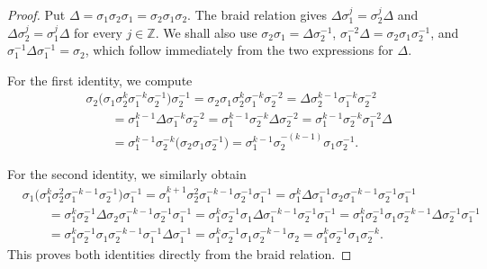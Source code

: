 \documentclass[10pt,a4paper]{amsart}
\begin{document}
\begin{proof}
Put $\Delta=\sigma_1\sigma_2\sigma_1=\sigma_2\sigma_1\sigma_2$. The braid relation gives $\Delta\sigma_1^j=\sigma_2^j\Delta$ and $\Delta\sigma_2^j=\sigma_1^j\Delta$ for every $j\in\mathbb Z$. We shall also use $\sigma_2\sigma_1=\Delta\sigma_2^{-1}$, $\sigma_1^{-2}\Delta=\sigma_2\sigma_1\sigma_2^{-1}$, and $\sigma_1^{-1}\Delta\sigma_1^{-1}=\sigma_2$, which follow immediately from the two expressions for $\Delta$.

For the first identity, we compute
\begin{align*}
&\sigma_2
 \bigl(\sigma_1\sigma_2^k\sigma_1^{-k}\sigma_2^{-1}\bigr)
 \sigma_2^{-1}
=\sigma_2\sigma_1\sigma_2^k\sigma_1^{-k}\sigma_2^{-2}
=\Delta\sigma_2^{k-1}\sigma_1^{-k}\sigma_2^{-2}\\
&\qquad
=\sigma_1^{k-1}\Delta\sigma_1^{-k}\sigma_2^{-2}
=\sigma_1^{k-1}\sigma_2^{-k}\Delta\sigma_2^{-2}
=\sigma_1^{k-1}\sigma_2^{-k}\sigma_1^{-2}\Delta\\
&\qquad
=\sigma_1^{k-1}\sigma_2^{-k}
 \bigl(\sigma_2\sigma_1\sigma_2^{-1}\bigr)
=\sigma_1^{k-1}\sigma_2^{-(k-1)}\sigma_1\sigma_2^{-1}.
\end{align*}

For the second identity, we similarly obtain
\begin{align*}
&\sigma_1
 \bigl(\sigma_1^k\sigma_2^2\sigma_1^{-k-1}\sigma_2^{-1}\bigr)
 \sigma_1^{-1}
=\sigma_1^{k+1}\sigma_2^2\sigma_1^{-k-1}\sigma_2^{-1}\sigma_1^{-1}
=\sigma_1^k\Delta\sigma_1^{-1}\sigma_2
 \sigma_1^{-k-1}\sigma_2^{-1}\sigma_1^{-1}\\
&\qquad
=\sigma_1^k\sigma_2^{-1}\Delta\sigma_2
 \sigma_1^{-k-1}\sigma_2^{-1}\sigma_1^{-1}
=\sigma_1^k\sigma_2^{-1}\sigma_1\Delta
 \sigma_1^{-k-1}\sigma_2^{-1}\sigma_1^{-1}
=\sigma_1^k\sigma_2^{-1}\sigma_1\sigma_2^{-k-1}
 \Delta\sigma_2^{-1}\sigma_1^{-1}\\
&\qquad
=\sigma_1^k\sigma_2^{-1}\sigma_1\sigma_2^{-k-1}
 \sigma_1^{-1}\Delta\sigma_1^{-1}
=\sigma_1^k\sigma_2^{-1}\sigma_1\sigma_2^{-k-1}\sigma_2
=\sigma_1^k\sigma_2^{-1}\sigma_1\sigma_2^{-k}.
\end{align*}
This proves both identities directly from the braid relation.
\end{proof}
\end{document}
